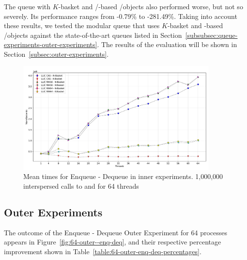 The queue with \(K\)-basket and \R/\W-based \LL/\IC objects also performed worse, but not so severely. Its performance ranges from -0.79\% to -281.49\%. Taking into account these results, we tested the modular queue that uses \(K\)-basket and \CAS-based \LL/\IC objects against the state-of-the-art queues listed in Section~\ref{subsubsec:queue-experiments-outer-experiments}. The results of the evaluation will be shown in Section~\ref{subsec:outer-experiments}.

\begin{figure}[ht!]
  \centering
  \includegraphics[width=0.9\textwidth]{contents/figures/V_64_inner_enq_deq_all.pdf}
  \caption{\label{fig:64-inner-enq-deq} Mean times for Enqueue - Dequeue in inner experiments. 1,000,000 interspersed calls to \Enq and \Deq  for 64 threads}
\end{figure}

%



\subsection{\label{subsec:outer-experiments}Outer Experiments}

The outcome of the Enqueue - Dequeue Outer Experiment for 64 processes appears in Figure~\ref{fig:64-outer--enq-deq}, and their respective percentage improvement shown in Table~\ref{table:64-outer-enq-deq-percentages}.

%


